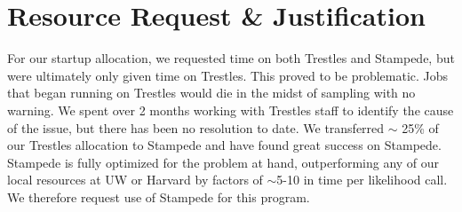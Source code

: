 \documentclass[11pt,preprint]{aastex}
\begin{document}





\section{Resource Request \& Justification}

For our startup allocation, we requested time on both Trestles and Stampede, but were ultimately only given time on Trestles.  This proved to be problematic.  Jobs that began running on Trestles would die in the midst of sampling with no warning.  We spent over 2 months working with Trestles staff to identify the cause of the issue, but there has been no resolution to date.  We transferred $\sim$ 25\% of our Trestles allocation to Stampede and have found great success on Stampede.  Stampede is fully optimized for the problem at hand, outperforming any of our local resources at UW or Harvard by factors of $\sim$5-10 in time per likelihood call.  We therefore request use of Stampede for this program.
\end{document}
